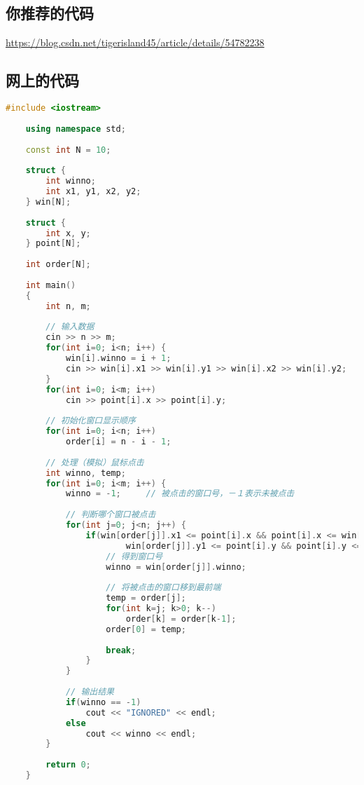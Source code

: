 \subsection{你推荐的代码}

\href{201403-2 窗口}{https://blog.csdn.net/tigerisland45/article/details/54782238}

\subsection{网上的代码}
\begin{lstlisting}[language=C++]
    #include <iostream>
     
    using namespace std;
     
    const int N = 10;
     
    struct {
        int winno;
        int x1, y1, x2, y2;
    } win[N];
     
    struct {
        int x, y;
    } point[N];
     
    int order[N];
     
    int main()
    {
        int n, m;
     
        // 输入数据
        cin >> n >> m;
        for(int i=0; i<n; i++) {
            win[i].winno = i + 1;
            cin >> win[i].x1 >> win[i].y1 >> win[i].x2 >> win[i].y2;
        }
        for(int i=0; i<m; i++)
            cin >> point[i].x >> point[i].y;
     
        // 初始化窗口显示顺序
        for(int i=0; i<n; i++)
            order[i] = n - i - 1;
     
        // 处理（模拟）鼠标点击
        int winno, temp;
        for(int i=0; i<m; i++) {
            winno = -1;     // 被点击的窗口号，－１表示未被点击
     
            // 判断哪个窗口被点击
            for(int j=0; j<n; j++) {
                if(win[order[j]].x1 <= point[i].x && point[i].x <= win[order[j]].x2 &&
                        win[order[j]].y1 <= point[i].y && point[i].y <= win[order[j]].y2) {
                    // 得到窗口号
                    winno = win[order[j]].winno;
     
                    // 将被点击的窗口移到最前端
                    temp = order[j];
                    for(int k=j; k>0; k--)
                        order[k] = order[k-1];
                    order[0] = temp;
     
                    break;
                }
            }
     
            // 输出结果
            if(winno == -1)
                cout << "IGNORED" << endl;
            else
                cout << winno << endl;
        }
     
        return 0;
    }
\end{lstlisting}